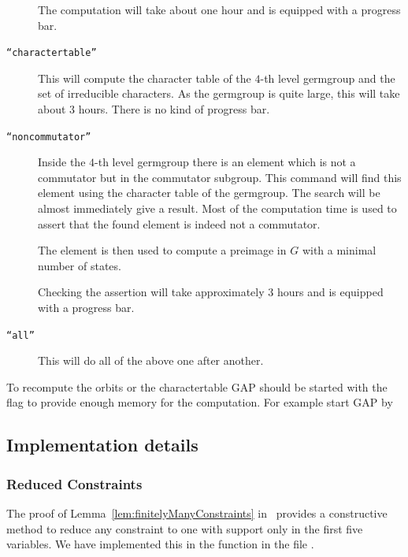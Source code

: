 \documentclass[a4paper,11pt]{amsart}
\begin{document}
\begin{description}
		      The computation will take about one hour and is equipped with a progress bar.
   \item [\texttt{``charactertable''}] This will compute the character table of the $4$-th level germgroup
		      and the set of irreducible characters. 
		      As the germgroup is quite large, this
		      will take about $3$ hours. There is no kind of progress bar.
   \item [\texttt{``noncommutator''}] Inside the $4$-th level germgroup there is an element which is not
		      a commutator but in the commutator subgroup. This command will find this 
		      element using the character table of the germgroup. The search will be 
		      almost immediately give a result. Most of the computation time is used
		      to assert that the found element is indeed not a commutator.
		      
		      The element is then used to compute a preimage in $G$ with a minimal 
		      number of states.

		      Checking the assertion will take approximately $3$ hours and is equipped 
		      with a progress bar. 
  \item [\texttt{``all''}] This will do all of the above one after another.		      
   \end{description}
To recompute the orbits or the charactertable GAP should be 
started with the  flag
to provide enough memory for the computation. For example start GAP by 


\subsection{Implementation details}
\label{sec:gap_details}
\subsubsection{Reduced Constraints}
The proof of Lemma~\ref{lem:finitelyManyConstraints} in~\cite{Lysenok-Miasnikov-Ushakov:QuadraticEquationsInGrig} 
provides a constructive method to reduce any constraint to one with support
only in the first five variables. 
We have implemented this in the function  in the file
.
\end{document}
